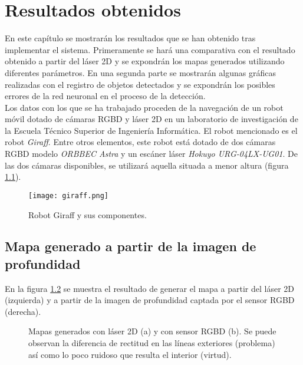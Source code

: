 \chapter{Resultados obtenidos} \label{chapter.resultados}

En este capítulo se mostrarán los resultados que se han obtenido tras implementar el sistema. Primeramente se hará una comparativa con el resultado obtenido a partir del láser 2D y se expondrán los mapas generados utilizando diferentes parámetros. En una segunda parte se mostrarán algunas gráficas realizadas con el registro de objetos detectados y se expondrán los posibles errores de la red neuronal en el proceso de la detección.\\

Los datos con los que se ha trabajado proceden de la navegación de un robot móvil dotado de cámaras RGBD y láser 2D en un laboratorio de investigación de la Escuela Técnico Superior de Ingeniería Informática. El robot mencionado es el robot \textit{Giraff}. Entre otros elementos, este robot está dotado de dos cámaras RGBD modelo \textit{ORBBEC Astra} y un escáner láser \textit{Hokuyo URG-04LX-UG01}. De las dos cámaras disponibles, se utilizará aquella situada a menor altura (figura \ref{fig:giraff}). \\

\begin{figure}[h]
	\begin{center} 
		\texttt{[image: giraff.png]}
	\end{center}
	\caption{Robot Giraff y sus componentes.}
	\label{fig:giraff}
\end{figure}

\section{Mapa generado a partir de la imagen de profundidad}

En la figura \ref{fig:res_mapas} se muestra el resultado de generar el mapa a partir del láser 2D (izquierda) y a partir de la imagen de profundidad captada por el sensor RGBD (derecha).\\

\begin{figure}[h]
 \centering
 \caption{Mapas generados con láser 2D (a) y con sensor RGBD (b). Se puede observan la diferencia de rectitud en las líneas exteriores (problema) así como lo poco ruidoso que resulta el interior (virtud).}
 \label{fig:res_mapas}
\end{figure}

